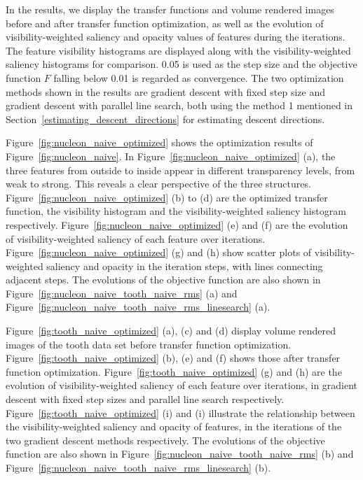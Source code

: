 In the results, we display the transfer functions and volume rendered images before and after transfer function optimization, as well as the evolution of visibility-weighted saliency and opacity values of features during the iterations.
The feature visibility histograms \cite{wang_efficient_2011} are displayed along with the visibility-weighted saliency histograms for comparison.
0.05 is used as the step size and the objective function $ F $ falling below 0.01 is regarded as convergence.
The two optimization methods shown in the results are gradient descent with fixed step size and gradient descent with parallel line search, both using the method 1 mentioned in Section~\ref{estimating_descent_directions} for estimating descent directions.

Figure~\ref{fig:nucleon_naive_optimized} shows the optimization results of Figure~\ref{fig:nucleon_naive}. In Figure~\ref{fig:nucleon_naive_optimized} (a), the three features from outside to inside appear in different transparency levels, from weak to strong. This reveals a clear perspective of the three structures.
Figure~\ref{fig:nucleon_naive_optimized} (b) to (d) are the optimized transfer function, the visibility histogram and the visibility-weighted saliency histogram respectively. Figure~\ref{fig:nucleon_naive_optimized} (e) and (f) are the evolution of visibility-weighted saliency of each feature over iterations. Figure~\ref{fig:nucleon_naive_optimized} (g) and (h) show scatter plots of visibility-weighted saliency and opacity in the iteration steps, with lines connecting adjacent steps.
The evolutions of the objective function are also shown in Figure~\ref{fig:nucleon_naive_tooth_naive_rms} (a) and Figure~\ref{fig:nucleon_naive_tooth_naive_rms_linesearch} (a).

Figure~\ref{fig:tooth_naive_optimized} (a), (c) and (d) display volume rendered images of the tooth data set before transfer function optimization. Figure~\ref{fig:tooth_naive_optimized} (b), (e) and (f) shows those after transfer function optimization.
Figure~\ref{fig:tooth_naive_optimized} (g) and (h) are the evolution of visibility-weighted saliency of each feature over iterations, in gradient descent with fixed step sizes and parallel line search respectively. Figure~\ref{fig:tooth_naive_optimized} (i) and (i) illustrate the relationship between the visibility-weighted saliency and opacity of features, in the iterations of the two gradient descent methods respectively.
The evolutions of the objective function are also shown in Figure~\ref{fig:nucleon_naive_tooth_naive_rms} (b) and Figure~\ref{fig:nucleon_naive_tooth_naive_rms_linesearch} (b).

